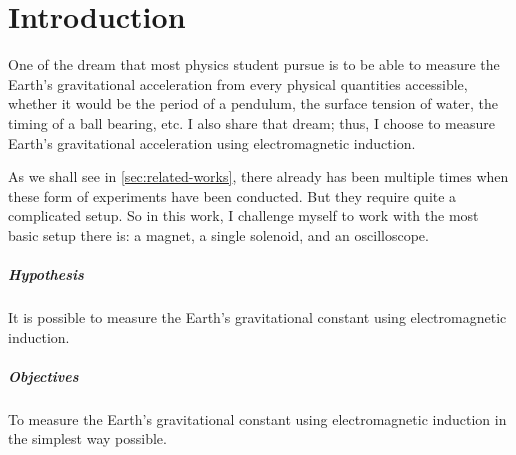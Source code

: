 \chapter{Introduction}

One of the dream that most physics student pursue is to be able to measure the Earth's gravitational acceleration from every physical quantities accessible, whether it would be the period of a pendulum, the surface tension of water, the timing of a ball bearing, etc. I also share that dream; thus, I choose to measure Earth's gravitational acceleration using electromagnetic induction.

As we shall see in \cref{sec:related-works}, there already has been multiple times when these form of experiments have been conducted. But they require quite a complicated setup. So in this work, I challenge myself to work with the most basic setup there is: a magnet, a single solenoid, and an oscilloscope.

\paragraph{Hypothesis} It is possible to measure the Earth's gravitational constant using electromagnetic induction.

\paragraph{Objectives} To measure the Earth's gravitational constant using electromagnetic induction in the simplest way possible.
